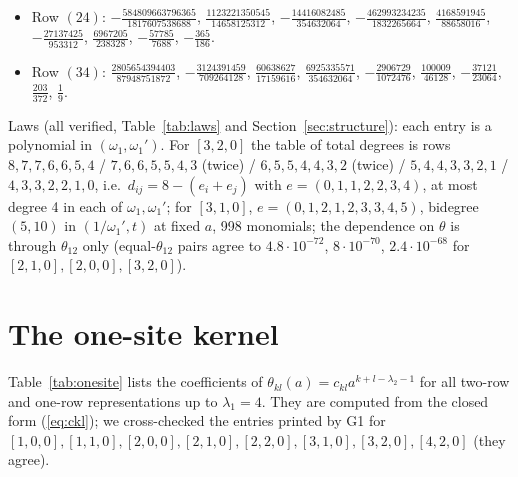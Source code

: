 \documentclass[11pt]{article}
\begin{document}
\begin{itemize}
\item Row $(24)$: $-\frac{584809663796365}{1817607538688}$, $\frac{1123221350545}{14658125312}$, $-\frac{14416082485}{354632064}$, $-\frac{462993234235}{1832265664}$, $\frac{4168591945}{88658016}$, $-\frac{27137425}{953312}$, $\frac{6967205}{238328}$, $-\frac{57785}{7688}$, $-\frac{365}{186}$.
\item Row $(34)$: $\frac{2805654394403}{87948751872}$, $-\frac{3124391459}{709264128}$, $\frac{60638627}{17159616}$, $\frac{6925335571}{354632064}$, $-\frac{2906729}{1072476}$, $\frac{100009}{46128}$, $-\frac{37121}{23064}$, $\frac{203}{372}$, $\frac{1}{9}$.
\end{itemize}

Laws (all verified, Table~\ref{tab:laws} and Section~\ref{sec:structure}): each entry is a polynomial in $(\omega_1,\omega_1')$. For $[3,2,0]$ the table of total degrees is rows $8,7,7,6,6,5,4$ / $7,6,6,5,5,4,3$ (twice) / $6,5,5,4,4,3,2$ (twice) / $5,4,4,3,3,2,1$ / $4,3,3,2,2,1,0$, i.e.\ $d_{ij}=8-(e_i+e_j)$ with $e=(0,1,1,2,2,3,4)$, at most degree 4 in each of $\omega_1,\omega_1'$; for $[3,1,0]$, $e=(0,1,2,1,2,3,3,4,5)$, bidegree $(5,10)$ in $(1/\omega_1',t)$ at fixed $a$, 998 monomials; the dependence on $\theta$ is through $\theta_{12}$ only (equal-$\theta_{12}$ pairs agree to $4.8\cdot10^{-72}$, $8\cdot10^{-70}$, $2.4\cdot10^{-68}$ for $[2,1,0],[2,0,0],[3,2,0]$).

\section{The one-site kernel}\label{app:C}

Table~\ref{tab:onesite} lists the coefficients of $\theta_{kl}(a)=c_{kl}a^{k+l-\lambda_2-1}$ for all two-row and one-row representations up to $\lambda_1=4$. They are computed from the closed form (\ref{eq:ckl}); we cross-checked the entries printed by G1 for $[1,0,0],[1,1,0],[2,0,0],[2,1,0],[2,2,0],[3,1,0],[3,2,0],[4,2,0]$ (they agree).
\end{document}
